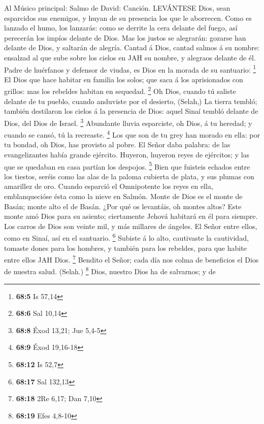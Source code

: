  Al Músico principal: Salmo de David: Canción. LEVÁNTESE
Dios, sean esparcidos sus enemigos, y huyan de su presencia los que le
aborrecen.  Como es lanzado el humo, los lanzarás: como se
derrite la cera delante del fuego, así perecerán los impíos delante de
Dios.  Mas los justos se alegrarán: gozarse han delante de
Dios, y saltarán de alegría.  Cantad á Dios, cantad salmos á
su nombre: ensalzad al que sube sobre los cielos en JAH su nombre, y
alegraos delante de él.  Padre de huérfanos y defensor de
viudas, es Dios en la morada de su santuario: \footnote{\textbf{68:5} Is
  57,14}  El Dios que hace habitar en familia los solos; que
saca á los aprisionados con grillos: mas los rebeldes habitan en
sequedad. \footnote{\textbf{68:6} Sal 10,14}  Oh Dios,
cuando tú saliste delante de tu pueblo, cuando anduviste por el
desierto, (Selah,)  La tierra tembló; también destilaron los
cielos á la presencia de Dios: aquel Sinaí tembló delante de Dios, del
Dios de Israel. \footnote{\textbf{68:8} Éxod 13,21; Jue 5,4-5}
 Abundante lluvia esparciste, oh Dios, á tu heredad; y
cuando se cansó, tú la recreaste. \footnote{\textbf{68:9} Éxod 19,16-18}
 Los que son de tu grey han morado en ella: por tu bondad,
oh Dios, has provisto al pobre.  El Señor daba palabra: de
las evangelizantes había grande ejército.  Huyeron, huyeron
reyes de ejércitos; y las que se quedaban en casa partían los despojos.
\footnote{\textbf{68:12} Is 52,7}  Bien que fuisteis
echados entre los tiestos, seréis como las alas de la paloma cubierta de
plata, y sus plumas con amarillez de oro.  Cuando esparció
el Omnipotente los reyes en ella, emblanquecióse ésta como la nieve en
Salmón.  Monte de Dios es el monte de Basán; monte alto el
de Basán.  ¿Por qué os levantáis, oh montes altos? Este
monte amó Dios para su asiento; ciertamente Jehová habitará en él para
siempre.  Los carros de Dios son veinte mil, y más millares
de ángeles. El Señor entre ellos, como en Sinaí, así en el santuario.
\footnote{\textbf{68:17} Sal 132,13}  Subiste á lo alto,
cautivaste la cautividad, tomaste dones para los hombres, y también para
los rebeldes, para que habite entre ellos JAH Dios. \footnote{\textbf{68:18}
  2Re 6,17; Dan 7,10}  Bendito el Señor; cada día nos colma
de beneficios el Dios de nuestra salud. (Selah.) \footnote{\textbf{68:19}
  Efes 4,8-10}  Dios, nuestro Dios ha de salvarnos; y de
